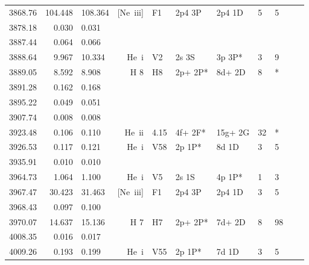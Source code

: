 \begin{longtable}{lrlrlllllll}
 3868.76 & 104.448 & 108.364 &  [Ne~{\sc iii}]  &  F1        &  2p4 3P    &  2p4 1D    &          5 &        5    \\
 3878.18 &   0.030 &   0.031                                                                                      \\
 3887.44 &   0.064 &   0.066                                                                                      \\
 3888.64 &   9.967 &  10.334 &  He~{\sc i}      &  V2        &  2s 3S     &  3p 3P*    &          3 &        9    \\
 3889.05 &   8.592 &   8.908 &  H 8       &  H8        &  2p+ 2P*   &  8d+ 2D    &          8 &        *          \\
 3891.28 &   0.162 &   0.168                                                                                      \\
 3895.22 &   0.049 &   0.051                                                                                      \\
 3907.74 &   0.008 &   0.008                                                                                      \\
 3923.48 &   0.106 &   0.110 &  He~{\sc ii}     &  4.15      &  4f+ 2F*   &  15g+ 2G   &         32 &        *    \\
 3926.53 &   0.117 &   0.121 &  He~{\sc i}      &  V58       &  2p 1P*    &  8d 1D     &          3 &        5    \\
 3935.91 &   0.010 &   0.010                                                                                      \\
 3964.73 &   1.064 &   1.100 &  He~{\sc i}      &  V5        &  2s 1S     &  4p 1P*    &          1 &        3    \\
 3967.47 &  30.423 &  31.463 &  [Ne~{\sc iii}]  &  F1        &  2p4 3P    &  2p4 1D    &          3 &        5    \\
 3968.43 &   0.097 &   0.100                                                                                      \\
 3970.07 &  14.637 &  15.136 &  H 7       &  H7        &  2p+ 2P*   &  7d+ 2D    &          8 &       98          \\
 4008.35 &   0.016 &   0.017                                                                                      \\
 4009.26 &   0.193 &   0.199 &  He~{\sc i}      &  V55       &  2p 1P*    &  7d 1D     &          3 &        5    \\

\end{longtable}

